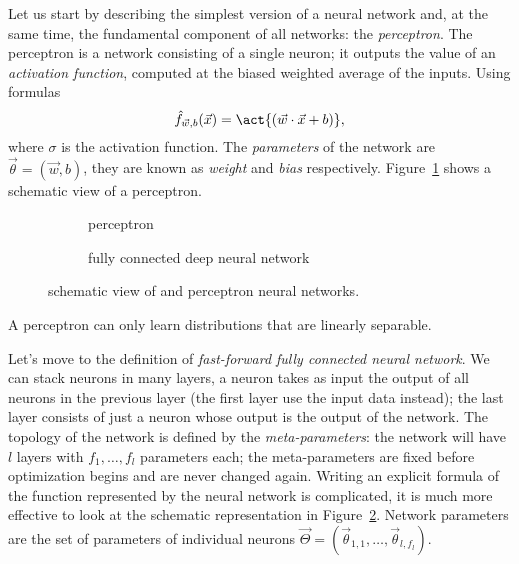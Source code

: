 Let us start by describing the simplest version of a neural network and,  at the same time, the fundamental component of all networks: the \emph{perceptron}.
The perceptron is a network consisting of a single neuron; it outputs the value of an \emph{activation function}, computed at the biased weighted average of the inputs.
Using formulas
\[
  \hat{f}_{\vec{w},b}{(\vec{x})} = \act{\left(\vec{w}\cdot\vec{x}+b\right)},
\]
where \(\sigma\) is the activation function. The \emph{parameters} of the network are \(\vec{\theta}=(\vec{w},b)\),
they are known as \emph{weight} and \emph{bias} respectively.
Figure~\ref{fig:nn_perceptron} shows a schematic view of a perceptron.
\begin{figure}
  \centering
  \begin{subfigure}{0.495\textwidth}
    \begin{tikzpicture}[x=1.5cm, y=1.2cm, >=latex]
      
    \end{tikzpicture}
    \caption{perceptron}
    \label{fig:nn_perceptron}
  \end{subfigure}
  \begin{subfigure}{0.495\textwidth}
    \begin{tikzpicture}[x=1.cm, y=1.cm, >=latex]
      
    \end{tikzpicture}
    \caption{fully connected deep neural network}
    \label{fig:nn_ffnn}
  \end{subfigure}
  \caption{
    schematic view of and perceptron neural networks.
  }
  \label{fig:nn}
\end{figure}
A perceptron can only learn distributions that are linearly separable.

Let's move to the definition of \emph{fast-forward fully connected neural network}.
We can stack neurons in many layers, a neuron takes as input the output of all neurons in the previous layer (the first layer use the input data instead);
the last layer consists of just a neuron whose output is the output of the network.
The topology of the network is defined by the \emph{meta-parameters}: the network will have \(l\) layers with \(f_1,\dots,f_l\) parameters each;
the meta-parameters are fixed before optimization begins and are never changed again.
Writing an explicit formula of the function represented by the neural network is complicated,
it is much more effective to look at the schematic representation in Figure~\ref{fig:nn_ffnn}.
Network parameters are the set of parameters of individual neurons \(\vec{\Theta} = (\vec{\theta}_{1,1},\dots,\vec{\theta}_{l,f_l})\).

